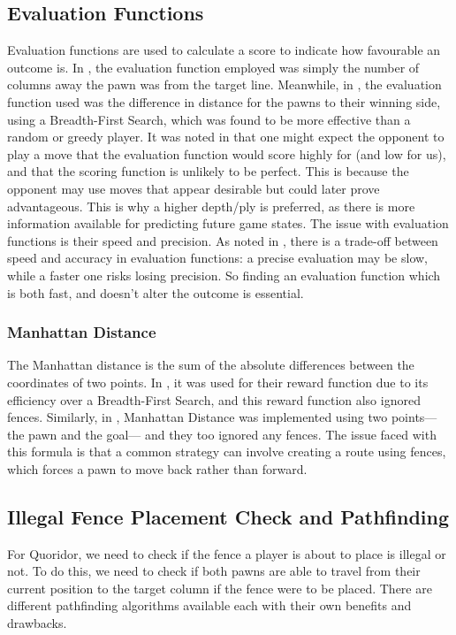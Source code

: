 \documentclass[review]{cmpreport}
\begin{document}
\subsection{Evaluation Functions}
Evaluation functions are used to calculate a score to indicate how favourable an outcome is. In \cite{mertens2006quoridor}, the evaluation function employed was simply the number of columns away the pawn was from the target line. Meanwhile, in \cite{josequoridor}, the evaluation function used was the difference in distance for the pawns to their winning side, using a Breadth-First Search, which was found to be more effective than a random or greedy player. It was noted in \cite{strong2011minimax} that one might expect the opponent to play a move that the evaluation function would score highly for (and low for us), and that the scoring function is unlikely to be perfect. This is because the opponent may use moves that appear desirable but could later prove advantageous. This is why a higher depth/ply is preferred, as there is more information available for predicting future game states. The issue with evaluation functions is their speed and precision. As noted in \cite{brenner2015artificial}, there is a trade-off between speed and accuracy in evaluation functions: a precise evaluation may be slow, while a faster one risks losing precision. So finding an evaluation function which is both fast, and doesn't alter the outcome is essential.

\subsubsection{Manhattan Distance}
The Manhattan distance is the sum of the absolute differences between the coordinates of two points. In \cite{josequoridor}, it was used for their reward function due to its efficiency over a Breadth-First Search, and this reward function also ignored fences. Similarly, in \cite{glendenning2005mastering}, Manhattan Distance was implemented using two points—the pawn and the goal— and they too ignored any fences. The issue faced with this formula is that a common strategy can involve creating a route using fences, which forces a pawn to move back rather than forward.

\subsection{Illegal Fence Placement Check and Pathfinding}
For Quoridor, we need to check if the fence a player is about to place is illegal or not. To do this, we need to check if both pawns are able to travel from their current position to the target column if the fence were to be placed. There are different pathfinding algorithms available each with their own benefits and drawbacks.
\end{document}
